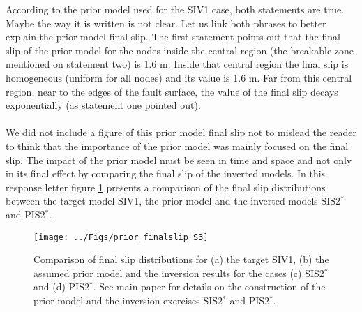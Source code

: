 \documentclass[10pt]{extarticle}
\begin{document}
\begin{Answer}
According to the prior model used for the SIV1 case, both statements
are true. Maybe the way it is written is not clear. Let us link both 
phrases to better explain the prior model final slip. The first statement 
points out that the final slip of the prior model for the nodes inside 
the central region (the breakable zone mentioned on statement two) is 1.6 m. 
Inside that central region the final slip is homogeneous (uniform for all 
nodes) and its value is 1.6 m. Far from this central region, near to the 
edges of the fault surface, the value of the final slip decays exponentially 
(as statement one pointed out). \\
\\
We did not include a figure of this prior model final slip not to mislead 
the reader to think that the importance of the prior model was mainly focused 
on the final slip. The impact of the prior model must be seen in time and space 
and not only in its final effect by comparing the final slip of the inverted 
models. In this response letter figure \ref{fig:figure_s4} presents a comparison 
of the final slip distributions between the target model SIV1, the prior model 
and the inverted models SIS2$^*$ and PIS2$^*$. \\
\begin{figure}[!h]
 \begin{center}
  \texttt{[image: ../Figs/prior\_finalslip\_S3]} 
 \end{center}
  \caption{Comparison of final slip distributions for (a) the target 
    SIV1, (b) the assumed prior model and the inversion results for the 
    cases (c) SIS2$^*$ and (d) PIS2$^*$. See main paper for details on 
    the construction of the prior model and the inversion exercises 
    SIS2$^*$ and PIS2$^*$.}
    \label{fig:figure_s4}
\end{figure}\\
 \WorkInProgressRevTask
\end{Answer}
\end{document}
